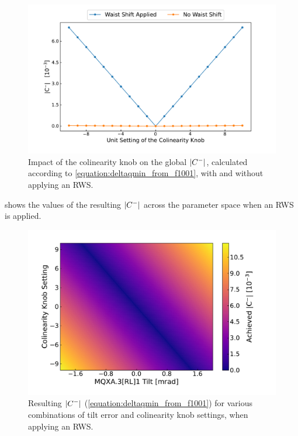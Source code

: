 \begin{figure}[!htb]
    \centering
    \includegraphics*[width=0.99\columnwidth]{Figures/IR_Coupling_Correction/colin_knob_vs_waist_shift.pdf}
    \caption{Impact of the colinearity knob on the global \(\left\lvert C^{-} \right\rvert\), calculated according to \cref{equation:deltaqmin_from_f1001}, with and without applying an RWS.}
    \label{figure:knob_to_cminus_with_waist}
\end{figure}

 shows the values of the resulting \(\left\lvert C^{-} \right\rvert\) across the parameter space when an RWS is applied.

\begin{figure}[!htb]
    \centering
    \includegraphics*[width=0.99\columnwidth]{Figures/IR_Coupling_Correction/cminus_colin_tilt_compensation_with_waist.pdf}
    \caption{Resulting \(\left\lvert C^{-} \right\rvert\) (\cref{equation:deltaqmin_from_f1001}) for various combinations of tilt error and colinearity knob settings, when applying an RWS.}
    \label{figure:cminus_colin_vs_tilt_with_waist}
\end{figure}

